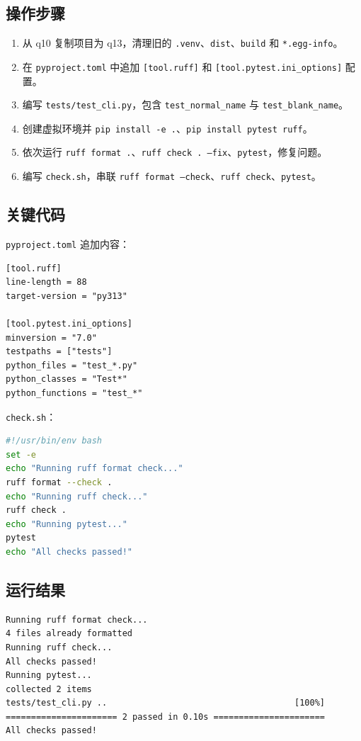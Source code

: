 \documentclass[12pt,a4paper]{ctexart}
\begin{document}
\subsection{操作步骤}
\begin{enumerate}
    \item 从 q10 复制项目为 q13，清理旧的 \texttt{.venv}、\texttt{dist}、\texttt{build} 和 \texttt{*.egg-info}。
    \item 在 \texttt{pyproject.toml} 中追加 \texttt{[tool.ruff]} 和 \texttt{[tool.pytest.ini\_options]} 配置。
    \item 编写 \texttt{tests/test\_cli.py}，包含 \texttt{test\_normal\_name} 与 \texttt{test\_blank\_name}。
    \item 创建虚拟环境并 \texttt{pip install -e .}、\texttt{pip install pytest ruff}。
    \item 依次运行 \texttt{ruff format .}、\texttt{ruff check . --fix}、\texttt{pytest}，修复问题。
    \item 编写 \texttt{check.sh}，串联 \texttt{ruff format --check}、\texttt{ruff check}、\texttt{pytest}。
\end{enumerate}

\subsection{关键代码}

\texttt{pyproject.toml} 追加内容：
\begin{lstlisting}
[tool.ruff]
line-length = 88
target-version = "py313"

[tool.pytest.ini_options]
minversion = "7.0"
testpaths = ["tests"]
python_files = "test_*.py"
python_classes = "Test*"
python_functions = "test_*"
\end{lstlisting}

\texttt{check.sh}：
\begin{lstlisting}[language=bash]
#!/usr/bin/env bash
set -e
echo "Running ruff format check..."
ruff format --check .
echo "Running ruff check..."
ruff check .
echo "Running pytest..."
pytest
echo "All checks passed!"
\end{lstlisting}

\subsection{运行结果}
\begin{lstlisting}
Running ruff format check...
4 files already formatted
Running ruff check...
All checks passed!
Running pytest...
collected 2 items
tests/test_cli.py ..                                     [100%]
====================== 2 passed in 0.10s ======================
All checks passed!
\end{lstlisting}
\end{document}
